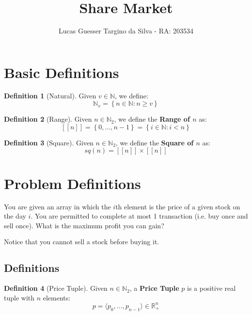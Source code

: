 \documentclass{article}
\title{Share Market}
\author{Lucas Guesser Targino da Silva - RA: 203534}
\newcommand{\R}{\mathbb{R}}
\newcommand{\N}{\mathbb{N}}
\newcommand{\Nb}[1]{\ensuremath{\N_{#1}}}
\newcommand{\Nt}{\Nb{2}}
\newcommand{\range}[1]{\ensuremath{\left[\left[ #1 \right]\right]}}
\newcommand{\Square}[1]{\ensuremath{sq({#1})}}
\newcommand{\Set}[1]{\ensuremath{\left\{ #1 \right\}}}
\newcommand{\SetOf}[2]{\ensuremath{\Set{ #1 : #2}}}
\theoremstyle{definition}
\newtheorem{defn}{Definition}
\theoremstyle{plain}
\begin{document}
\maketitle

\section{Basic Definitions}

\begin{defn}[Natural]
    Given $v \in \N$, we define:
    \begin{equation}
        \Nb{v} = \SetOf{n \in \N}{n \geqslant v}
    \end{equation}
\end{defn}

\begin{defn}[Range]
    \label{def:range}
    Given $n \in \Nt$, we define the \textbf{Range of $n$} as:
    \begin{equation}
        \range{n} = \Set{0, \dots, n - 1} = \SetOf{i \in \N}{i < n}
    \end{equation}
\end{defn}

\begin{defn}[Square]
    \label{def:square}
    Given $n \in \Nt$, we define the \textbf{Square of $n$} as:
    \begin{equation}
        \Square{n} = \range{n} \times \range{n}
    \end{equation}
\end{defn}

\section{Problem Definitions}

You are given an array in which the $i$th element is the price of a given stock on the day $i$. You are permitted to complete at most 1 transaction (i.e. buy once and sell once). What is the maximum profit you can gain?

Notice that you cannot sell a stock before buying it.

\subsection{Definitions}

\begin{defn}[Price Tuple]
    \label{def:price}
    Given $n \in \Nt$, a \textbf{Price Tuple} $p$ is a positive real tuple with $n$ elements:
    \begin{equation}
        p = \langle p_{0}, \dots, p_{n-1} \rangle \in \R^n_+
    \end{equation}
\end{defn}
\end{document}
